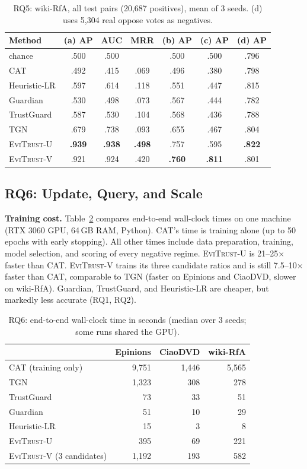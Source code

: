 \documentclass[conference]{IEEEtran}
\newcommand{\eviU}{\textsc{EviTrust}-U}
\newcommand{\eviV}{\textsc{EviTrust}-V}
\begin{document}
\begin{table}[t]
\centering
\caption{RQ5: wiki-RfA, all test pairs (20{,}687 positives), mean of 3 seeds. (d) uses 5{,}304 real oppose votes as negatives.}
\label{tab:rfa}
\setlength{\tabcolsep}{2.6pt}
\begin{tabular}{lcccccc}
\toprule
Method & (a) AP & AUC & MRR & (b) AP & (c) AP & (d) AP \\
\midrule
chance & .500 & .500 & & .500 & .500 & .796 \\
CAT & .492 & .415 & .069 & .496 & .380 & .798 \\
Heuristic-LR & .597 & .614 & .118 & .551 & .447 & .815 \\
Guardian & .530 & .498 & .073 & .567 & .444 & .782 \\
TrustGuard & .587 & .530 & .104 & .568 & .436 & .788 \\
TGN & .679 & .738 & .093 & .655 & .467 & .804 \\
\midrule
\eviU{} & \textbf{.939} & \textbf{.938} & \textbf{.498} & .757 & .595 & \textbf{.822} \\
\eviV{} & .921 & .924 & .420 & \textbf{.760} & \textbf{.811} & .801 \\
\bottomrule
\end{tabular}
\end{table}

\subsection{RQ6: Update, Query, and Scale}
\label{sec:rq6}

\textbf{Training cost.} Table~\ref{tab:cost} compares end-to-end wall-clock times on one machine (RTX 3060 GPU, 64\,GB RAM, Python). CAT's time is training alone (up to 50 epochs with early stopping). All other times include data preparation, training, model selection, and scoring of every negative regime. \eviU{} is 21--25$\times$ faster than CAT. \eviV{} trains its three candidate ratios and is still 7.5--10$\times$ faster than CAT, comparable to TGN (faster on Epinions and CiaoDVD, slower on wiki-RfA). Guardian, TrustGuard, and Heuristic-LR are cheaper, but markedly less accurate (RQ1, RQ2).

\begin{table}[t]
\centering
\caption{RQ6: end-to-end wall-clock time in seconds (median over 3 seeds; some runs shared the GPU).}
\label{tab:cost}
\begin{tabular}{lrrr}
\toprule
& Epinions & CiaoDVD & wiki-RfA \\
\midrule
CAT (training only) & 9{,}751 & 1{,}446 & 5{,}565 \\
TGN & 1{,}323 & 308 & 278 \\
TrustGuard & 73 & 33 & 51 \\
Guardian & 51 & 10 & 29 \\
Heuristic-LR & 15 & 3 & 8 \\
\eviU{} & 395 & 69 & 221 \\
\eviV{} (3 candidates) & 1{,}192 & 193 & 582 \\
\bottomrule
\end{tabular}
\end{table}
\end{document}
